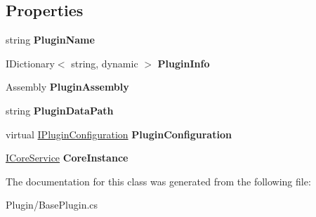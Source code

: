 \subsection*{Properties}
\begin{DoxyCompactItemize}
\item 
\hypertarget{class_snowflake_1_1_plugin_1_1_base_plugin_a4591bc8fb9ea5be53875efaa0349645a}{}string {\bfseries Plugin\+Name}\label{class_snowflake_1_1_plugin_1_1_base_plugin_a4591bc8fb9ea5be53875efaa0349645a}

\item 
\hypertarget{class_snowflake_1_1_plugin_1_1_base_plugin_a60c0ea3db85d4a7c4be409b20f7f09f5}{}I\+Dictionary$<$ string, dynamic $>$ {\bfseries Plugin\+Info}\label{class_snowflake_1_1_plugin_1_1_base_plugin_a60c0ea3db85d4a7c4be409b20f7f09f5}

\item 
\hypertarget{class_snowflake_1_1_plugin_1_1_base_plugin_ab2809eeec133163a0b8975e702731e14}{}Assembly {\bfseries Plugin\+Assembly}\label{class_snowflake_1_1_plugin_1_1_base_plugin_ab2809eeec133163a0b8975e702731e14}

\item 
\hypertarget{class_snowflake_1_1_plugin_1_1_base_plugin_a15ce8469fbc8d41cb898f38a87d6e870}{}string {\bfseries Plugin\+Data\+Path}\label{class_snowflake_1_1_plugin_1_1_base_plugin_a15ce8469fbc8d41cb898f38a87d6e870}

\item 
\hypertarget{class_snowflake_1_1_plugin_1_1_base_plugin_a0d4668fd0807bb6914ca20003325a884}{}virtual \hyperlink{interface_snowflake_1_1_plugin_1_1_i_plugin_configuration}{I\+Plugin\+Configuration} {\bfseries Plugin\+Configuration}\label{class_snowflake_1_1_plugin_1_1_base_plugin_a0d4668fd0807bb6914ca20003325a884}

\item 
\hypertarget{class_snowflake_1_1_plugin_1_1_base_plugin_af64e9b0ef81c66e11dac65f0d789a55e}{}\hyperlink{interface_snowflake_1_1_service_1_1_i_core_service}{I\+Core\+Service} {\bfseries Core\+Instance}\label{class_snowflake_1_1_plugin_1_1_base_plugin_af64e9b0ef81c66e11dac65f0d789a55e}

\end{DoxyCompactItemize}


The documentation for this class was generated from the following file\+:\begin{DoxyCompactItemize}
\item 
Plugin/Base\+Plugin.\+cs\end{DoxyCompactItemize}
